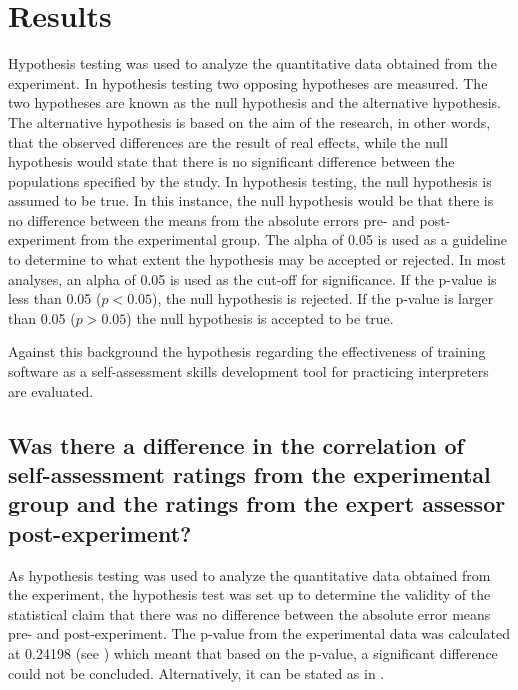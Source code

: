 \documentclass[output=paper]{langsci/langscibook}
\begin{document}
\section{Results}
Hypothesis testing was used to analyze the quantitative data obtained from the experiment. In hypothesis testing two opposing hypotheses are measured. The two hypotheses are known as the null hypothesis and the alternative hypothesis. The alternative hypothesis is based on the aim of the research, in other words, that the observed differences are the result of real effects, while the null hypothesis would state that there is no significant difference between the populations specified by the study. In hypothesis testing, the null hypothesis is assumed to be true. In this instance, the null hypothesis would be that there is no difference between the means from the absolute errors pre- and post-experiment from the experimental group. The alpha of 0.05 is used as a guideline to determine to what extent the hypothesis may be accepted or rejected. In most analyses, an alpha of 0.05 is used as the cut-off for significance. If the p-value is less than 0.05 ($p < 0.05$), the null hypothesis is rejected. If the p-value is larger than 0.05 ($p > 0.05$) the null hypothesis is accepted to be true. 

Against this background the hypothesis regarding the effectiveness of training software as a self-assessment skills development tool for practicing interpreters are evaluated.

\subsection{Was there a difference in the correlation of self-assessment ratings from the experimental group and the ratings from the expert assessor post-experiment?}

As hypothesis testing was used to analyze the quantitative data obtained from the experiment, the hypothesis test was set up to determine the validity of the statistical claim that there was no difference between the absolute error means pre- and post-experiment. The p-value from the experimental data was calculated at 0.24198 (see ) which meant that based on the p-value, a significant difference could not be concluded. Alternatively, it can be stated as in .
\end{document}
